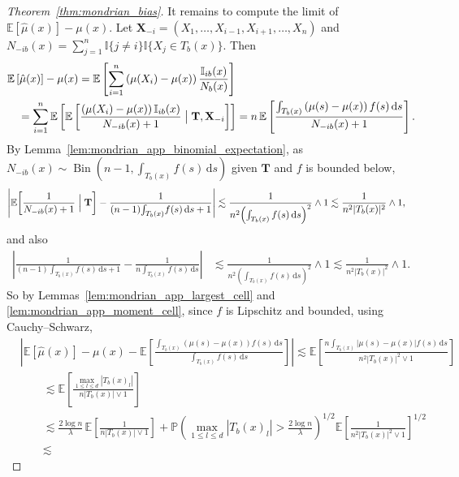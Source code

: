 \documentclass[11pt,lof]{puthesis}
\renewcommand{\P}{\ensuremath{\mathbb{P}}}
\newcommand{\E}{\ensuremath{\mathbb{E}}}
\newcommand{\I}{\ensuremath{\mathbb{I}}}
\newcommand{\bX}{\ensuremath{\mathbf{X}}}
\newcommand{\bT}{\ensuremath{\mathbf{T}}}
\DeclareMathOperator{\Bin}{Bin}
\newcommand{\diff}[1]{\,\mathrm{d}#1}
\theoremstyle{break}
\theoremstyle{proof}
\newtheorem{proof}{Proof}
\begin{document}
\begin{proof}[Theorem~\ref{thm:mondrian_bias}]
It remains to compute the limit of
$\E \left[ \hat \mu(x) \right] - \mu(x)$.
Let $\bX_{-i} = (X_1, \ldots, X_{i-1}, X_{i+1}, \ldots, X_n)$
and $N_{-i b}(x) = \sum_{j=1}^n \I\{j \neq i\} \I\{X_j \in T_b(x)\}$.
Then
%
\begin{align*}
&\E \left[ \hat \mu(x) \right]
- \mu(x)
=
\E \left[
\sum_{i=1}^{n}
\left( \mu(X_i) - \mu(x) \right)
\frac{\I_{i b}(x)}{N_b(x)}
\right] \\
&\quad=
\sum_{i=1}^{n}
\E \left[
\E \left[
\frac{\left( \mu(X_i) - \mu(x) \right)\I_{i b}(x)}
{N_{-i b}(x) + 1}
\bigm| \bT, \bX_{-i}
\right]
\right]
= n \,
\E \left[
\frac{\int_{T_b(x)} \left( \mu(s) - \mu(x) \right) f(s) \diff s}
{N_{-i b}(x) + 1}
\right].
\end{align*}
%
By Lemma~\ref{lem:mondrian_app_binomial_expectation}, as
$N_{-i b}(x) \sim \Bin\left(n-1,
\int_{T_b(x)} f(s) \diff s \right)$
given $\bT$ and $f$ is bounded below,
%
\begin{align*}
\left|
\E \! \left[
\frac{1}{N_{-i b}(x) + 1}
\Bigm| \bT
\right]
- \frac{1}{(n-1) \! \int_{T_b(x)} \! f(s) \diff s + 1}
\right|
&\lesssim
\frac{1}{n^2 \! \left( \int_{T_b(x)} f(s) \diff s \right)^2}
\wedge 1
\lesssim
\frac{1}{n^2 |T_b(x)|^2}
\wedge 1,
\end{align*}
%
and also
%
\begin{align*}
\left|
\frac{1}{(n-1) \int_{T_b(x)} f(s) \diff s + 1}
- \frac{1}{n \int_{T_b(x)} f(s) \diff s}
\right|
&\lesssim
\frac{1}{n^2 \left( \int_{T_b(x)} f(s) \diff s\right)^2}
\wedge 1
\lesssim
\frac{1}{n^2 |T_b(x)|^2}
\wedge 1.
\end{align*}
%
So by Lemmas~\ref{lem:mondrian_app_largest_cell}
and \ref{lem:mondrian_app_moment_cell},
since $f$ is Lipschitz and bounded, using Cauchy--Schwarz,
%
\begin{align*}
&\left|
\E \left[ \hat \mu(x) \right]
- \mu(x)
- \E \left[
\frac{\int_{T_b(x)} \left( \mu(s) - \mu(x) \right) f(s) \diff s}
{\int_{T_b(x)} f(s) \diff s}
\right]
\right|
\lesssim
\E \left[
\frac{n \int_{T_b(x)} \left| \mu(s) - \mu(x) \right| f(s) \diff s}
{n^2 |T_b(x)|^2 \vee 1}
\right] \\
&\qquad\lesssim
\E \left[
\frac{\max_{1 \leq l \leq d} |T_b(x)_l| }
{n |T_b(x)| \vee 1}
\right] \\
&\qquad\lesssim
\frac{2 \log n}{\lambda} \,
\E \left[
\frac{1}{n |T_b(x)| \vee 1}
\right]
+ \P \left( \max_{1 \leq l \leq d} |T_b(x)_l| >
\frac{2 \log n}{\lambda} \right)^{1/2}
\E \left[
\frac{1}
{n^2 |T_b(x)|^2 \vee 1}
\right]^{1/2} \\
&\qquad\lesssim

\end{align*}
\end{proof}
\end{document}

